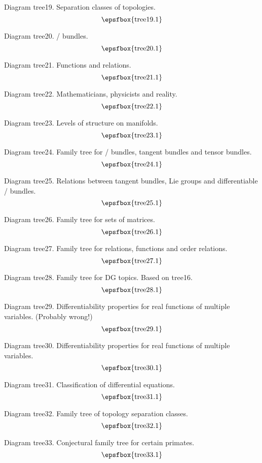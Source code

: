 \filleject

Diagram tree19. Separation classes of topologies.
$$
\centerline{\epsfbox{tree19.1}}
$$

Diagram tree20. \Fibre/ bundles.
$$
\centerline{\epsfbox{tree20.1}}
$$

Diagram tree21. Functions and relations.
$$
\centerline{\epsfbox{tree21.1}}
$$

Diagram tree22. Mathematicians, physicists and reality.
$$
\centerline{\epsfbox{tree22.1}}
$$

Diagram tree23. Levels of structure on manifolds.
$$
\centerline{\epsfbox{tree23.1}}
$$

\filleject

Diagram tree24. Family tree for \fibre/ bundles, tangent bundles and tensor
bundles.
$$
\centerline{\epsfbox{tree24.1}}
$$

Diagram tree25. Relations between tangent bundles, Lie groups and differentiable
\fibre/ bundles.
$$
\centerline{\epsfbox{tree25.1}}
$$

Diagram tree26. Family tree for sets of matrices.
$$
\centerline{\epsfbox{tree26.1}}
$$

Diagram tree27. Family tree for relations, functions and order relations.
$$
\centerline{\epsfbox{tree27.1}}
$$

\filleject

Diagram tree28. Family tree for DG topics. Based on tree16.
$$
\centerline{\epsfbox{tree28.1}}
$$

Diagram tree29. Differentiability properties for real functions of multiple
variables. (Probably wrong!)
$$
\centerline{\epsfbox{tree29.1}}
$$

Diagram tree30. Differentiability properties for real functions of multiple
variables.
$$
\centerline{\epsfbox{tree30.1}}
$$

Diagram tree31. Classification of differential equations.
$$
\centerline{\epsfbox{tree31.1}}
$$

\filleject

Diagram tree32. Family tree of topology separation classes.
$$
\centerline{\epsfbox{tree32.1}}
$$

Diagram tree33. Conjectural family tree for certain primates.
$$
\centerline{\epsfbox{tree33.1}}
$$

